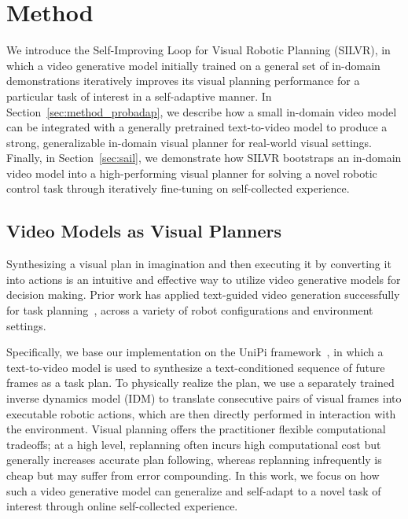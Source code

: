 \vspace{-0.5em}
\section{Method}
\vspace{-0.25em}

We introduce the Self-Improving Loop for Visual Robotic Planning (SILVR), in which a video generative model initially trained on a general set of in-domain demonstrations iteratively improves its visual planning performance for a particular task of interest in a self-adaptive manner. In Section~\ref{sec:method_probadap}, we describe how a small in-domain video model can be integrated with a generally pretrained text-to-video model to produce a strong, generalizable in-domain visual planner for real-world visual settings.  Finally, in Section~\ref{sec:sail}, we demonstrate how SILVR bootstraps an in-domain video model into a high-performing visual planner for solving a novel robotic control task through iteratively fine-tuning on self-collected experience.

\subsection{Video Models as Visual Planners}
\label{sec:method_visual_planner}
Synthesizing a visual plan in imagination and then executing it by converting it into actions is an intuitive and effective way to utilize video generative models for decision making.  Prior work has applied text-guided video generation successfully for task planning~\citep{du2024learning, du2024video, ajaj2023hip, luo2025solving}, across a variety of robot configurations and environment settings.


Specifically, we base our implementation on the UniPi framework~\citep{du2024learning}, in which a text-to-video model is used to synthesize a text-conditioned sequence of future frames as a task plan.  To physically realize the plan, we use a separately trained inverse dynamics model (IDM) to translate consecutive pairs of visual frames into executable robotic actions, which are then directly performed in interaction with the environment.  Visual planning offers the practitioner flexible computational tradeoffs; at a high level, replanning often incurs high computational cost but generally increases accurate plan following, whereas replanning infrequently is cheap but may suffer from error compounding.
In this work, we focus on how such a video generative model can generalize and self-adapt to a novel task of interest through online self-collected experience.

